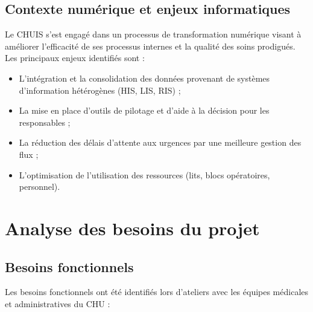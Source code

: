 \documentclass[12pt,a4paper]{report}
\begin{document}
	\subsection{Contexte numérique et enjeux informatiques}
	
	Le CHUIS s'est engagé dans un processus de transformation numérique visant à améliorer
	l'efficacité de ses processus internes et la qualité des soins prodigués. Les principaux
	enjeux identifiés sont :
	
	\begin{itemize}
		\item L'intégration et la consolidation des données provenant de systèmes d'information
		hétérogènes (HIS, LIS, RIS) ;
		\item La mise en place d'outils de pilotage et d'aide à la décision pour les responsables ;
		\item La réduction des délais d'attente aux urgences par une meilleure gestion des flux ;
		\item L'optimisation de l'utilisation des ressources (lits, blocs opératoires, personnel).
	\end{itemize}
	
	\section{Analyse des besoins du projet}
	
	\subsection{Besoins fonctionnels}
	
	Les besoins fonctionnels ont été identifiés lors d'ateliers avec les équipes médicales
	et administratives du CHU :
	
\end{document}
